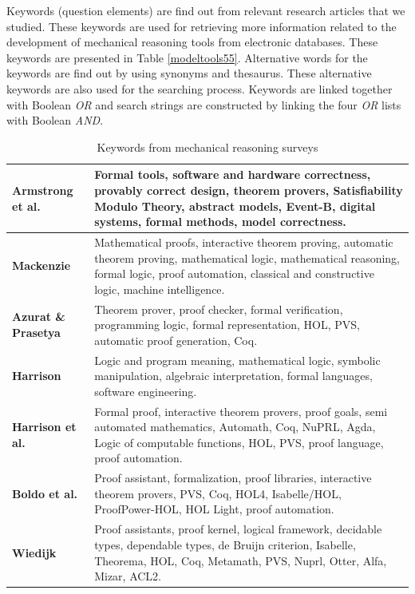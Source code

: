 Keywords (question elements) are find out from relevant research articles that we 
studied. These keywords are used for retrieving more information related to the development of mechanical reasoning tools from electronic databases.
These keywords are presented in Table \ref{modeltools55}. Alternative words for the keywords are 
find out by using synonyms and thesaurus. These alternative keywords are also used for the searching process. 
Keywords are linked together with Boolean \emph{OR} and search strings are constructed by linking the four \emph{OR} lists with Boolean \emph{AND}. 
\begin{table}[!ht]
 \caption{Keywords from mechanical reasoning surveys}\vspace*{-.2cm} 
 \centering 
\begin{tabular}{|p{1.2cm}|p{6.6cm}|}
  \hline
  \textbf{Armstrong et al.} \textbf{} & Formal tools, software and hardware correctness, provably correct design, 
  theorem provers, Satisfiability Modulo Theory, abstract models, Event-B, digital systems, formal methods, model correctness. \\   \hline
  \textbf{Mackenzie}  & Mathematical proofs, interactive theorem proving, automatic theorem proving,  mathematical logic, 
  mathematical reasoning, formal logic, proof automation, classical and constructive logic, machine intelligence. \\   \hline
  \textbf{Azurat \& Prasetya}  & Theorem prover, proof checker, formal verification, 
   programming logic, formal representation, HOL, PVS, automatic proof generation, Coq. \\   \hline
  \textbf{Harrison} & Logic and program meaning, mathematical logic, symbolic manipulation, algebraic interpretation, formal languages, 
                            software engineering. \\     \hline
  \textbf{Harrison et al.} & Formal proof, interactive theorem provers, proof goals, semi automated mathematics, Automath, Coq, NuPRL, Agda, 
                              Logic of computable functions, HOL, PVS, proof language, proof automation.  \\     \hline
  \textbf{Boldo et al. } & Proof assistant, formalization, proof libraries, interactive theorem provers, PVS, Coq, HOL4, Isabelle/HOL, 
                          ProofPower-HOL, HOL Light, proof automation. \\\hline
  \textbf{Wiedijk} & Proof assistants, proof kernel, logical framework, decidable types, dependable types, de Bruijn criterion, 
                            Isabelle, Theorema, HOL, Coq, Metamath, PVS, Nuprl, Otter, Alfa, Mizar, ACL2. \\      \hline

\end{tabular}
\end{table}
